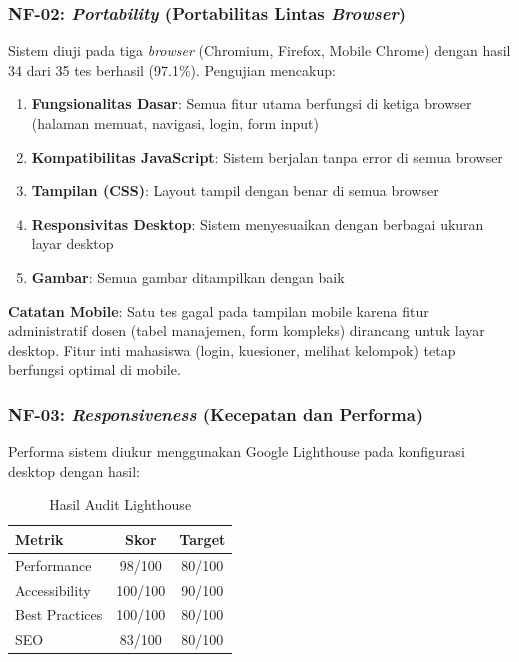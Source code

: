 \subsubsection{NF-02: \textit{Portability} (Portabilitas Lintas \textit{Browser})}

Sistem diuji pada tiga \textit{browser} (Chromium, Firefox, Mobile Chrome) dengan hasil 34 dari 35 tes berhasil (97.1\%). Pengujian mencakup:

\begin{enumerate}
	\item \textbf{Fungsionalitas Dasar}: Semua fitur utama berfungsi di ketiga browser (halaman memuat, navigasi, login, form input)
	\item \textbf{Kompatibilitas JavaScript}: Sistem berjalan tanpa error di semua browser
	\item \textbf{Tampilan (CSS)}: Layout tampil dengan benar di semua browser
	\item \textbf{Responsivitas Desktop}: Sistem menyesuaikan dengan berbagai ukuran layar desktop
	\item \textbf{Gambar}: Semua gambar ditampilkan dengan baik
\end{enumerate}

\textbf{Catatan Mobile}: Satu tes gagal pada tampilan mobile karena fitur administratif dosen (tabel manajemen, form kompleks) dirancang untuk layar desktop. Fitur inti mahasiswa (login, kuesioner, melihat kelompok) tetap berfungsi optimal di mobile.

\subsubsection{NF-03: \textit{Responsiveness} (Kecepatan dan Performa)}

Performa sistem diukur menggunakan Google Lighthouse pada konfigurasi desktop dengan hasil:

\begin{table}[H]
	\centering
	\begin{tabular}{|l|c|c|}
		\hline
		\textbf{Metrik} & \textbf{Skor} & \textbf{Target} \\
		\hline
		Performance     & 98/100        & 80/100          \\
		\hline
		Accessibility   & 100/100       & 90/100          \\
		\hline
		Best Practices  & 100/100       & 80/100          \\
		\hline
		SEO             & 83/100        & 80/100          \\
		\hline
	\end{tabular}
	\caption{Hasil Audit Lighthouse}
\end{table}

